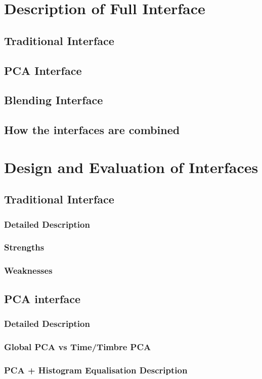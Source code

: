 \documentclass[11pt, oneside]{report}   	%
\begin{document}
\chapter{Description of Full Interface}
\section{Traditional Interface}
\section{PCA Interface}
\section{Blending Interface}
\section{How the interfaces are combined}

\chapter{Design and Evaluation of Interfaces}
\section{Traditional Interface}
\subsection{Detailed Description}
\subsection{Strengths}
\subsection{Weaknesses}

\section{PCA interface}
\subsection{Detailed Description}
\subsection{Global PCA vs Time/Timbre PCA}
\subsection{PCA + Histogram Equalisation Description}
\end{document}
